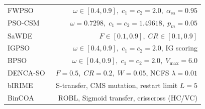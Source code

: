 \begin{table}[!htb]
\begin{tabular*}{\linewidth}{@{\extracolsep{\fill}}lr@{}}
FWPSO~\cite{wangjia2022} & $\omega \in [0.4, 0.9], \; c_1=c_2=2.0, \; \alpha_{\mathrm{sa}}=0.95$ \\
PSO-CSM~\cite{wei2025} & $\omega=0.7298, \; c_1=c_2=1.49618, \; p_m=0.05$ \\
SaWDE~\cite{wang2022} & $F \in [0.1, 0.9], \; CR \in [0.1, 0.9]$ \\
IGPSO~\cite{xuezhang2024} & $\omega \in [0.4, 0.9], \; c_1=c_2=2.0$, IG scoring \\
BPSO~\cite{kennedy1997} & $\omega \in [0.4, 0.9], \; c_1=c_2=2.0, \; V_{\max}=6.0$ \\
DENCA-SO~\cite{hancer2023} & $F=0.5, \; CR=0.2, \; W=0.05$, NCFS $\lambda=0.01$ \\
bIRIME~\cite{su2024} & S-transfer, CMS mutation, restart limit $L=5$ \\
BinCOA~\cite{shikoun2024} & ROBL, Sigmoid transfer, crisscross (HC/VC) \\
\bottomrule
\end{tabular*}
\end{table}
